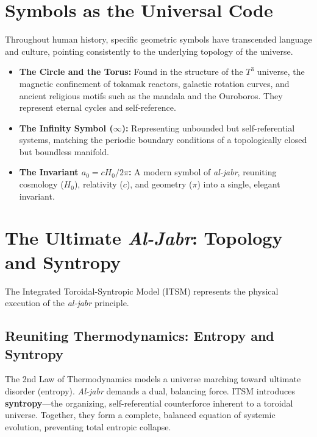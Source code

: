 \documentclass[aps,prd,11pt,onecolumn,superscriptaddress,nofootinbib,floatfix]{revtex4-2}
\begin{document}
\section{Symbols as the Universal Code}
\label{sec:symbols}

Throughout human history, specific geometric symbols have transcended language and culture, pointing consistently to the underlying topology of the universe.

\begin{itemize}
    \item \textbf{The Circle and the Torus:} Found in the structure of the $T^3$ universe, the magnetic confinement of tokamak reactors, galactic rotation curves, and ancient religious motifs such as the mandala and the Ouroboros. They represent eternal cycles and self-reference.
    \item \textbf{The Infinity Symbol ($\infty$):} Representing unbounded but self-referential systems, matching the periodic boundary conditions of a topologically closed but boundless manifold.
    \item \textbf{The Invariant $a_0 = cH_0/2\pi$:} A modern symbol of \textit{al-jabr}, reuniting cosmology ($H_0$), relativity ($c$), and geometry ($\pi$) into a single, elegant invariant.
\end{itemize}

\section{The Ultimate \textit{Al-Jabr}: Topology and Syntropy}
\label{sec:itsm-aljabr}

The Integrated Toroidal-Syntropic Model (ITSM) \cite{itsm_main} represents the physical execution of the \textit{al-jabr} principle.

\subsection{Reuniting Thermodynamics: Entropy and Syntropy}
The 2nd Law of Thermodynamics models a universe marching toward ultimate disorder (entropy). \textit{Al-jabr} demands a dual, balancing force. ITSM introduces \textbf{syntropy}—the organizing, self-referential counterforce inherent to a toroidal universe. Together, they form a complete, balanced equation of systemic evolution, preventing total entropic collapse.
\end{document}
